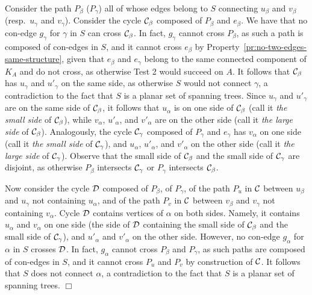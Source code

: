 \documentclass[letter,runningheads]{llncs}
\renewenvironment{proof}
{{\em Proof.\ }}{\hspace*{\fill}$\Box$\par\vspace{2mm}}
\begin{document}
\begin{proof}
Consider the path $P_{\beta}$ ($P_{\gamma}$) all of whose edges belong to $S$ connecting $u_{\beta}$ and $v_{\beta}$ (resp.\ $u_{\gamma}$ and $v_{\gamma}$). Consider the cycle ${\cal C}_{\beta}$ composed of $P_{\beta}$ and $e_{\beta}$. We have that no con-edge $g_{\gamma}$ for $\gamma$ in $S$ can cross ${\cal C}_{\beta}$. In fact, $g_{\gamma}$ cannot cross $P_{\beta}$, as such a path is composed of con-edges in $S$, and it cannot cross $e_{\beta}$ by Property~\ref{pr:no-two-edges-same-structure}, given that $e_{\beta}$ and $e_{\gamma}$ belong to the same connected component of $K_A$ and do not cross, as otherwise {\sc Test 2} would succeed on $A$. It follows that ${\cal C}_{\beta}$ has $u_{\gamma}$ and $u'_{\gamma}$ on the same side, as otherwise $S$ would not connect $\gamma$, a contradiction to the fact that $S$ is a planar set of spanning trees. Since $u_{\gamma}$ and $u'_{\gamma}$ are on the same side of ${\cal C}_{\beta}$, it follows that $u_{\alpha}$ is on one side of ${\cal C}_{\beta}$ (call it {\em the small side} of ${\cal C}_{\beta}$), while $v_{\alpha}$, $u'_{\alpha}$, and $v'_{\alpha}$ are on the other side (call it {\em the large side} of ${\cal C}_{\beta}$). Analogously, the cycle ${\cal C}_{\gamma}$ composed of $P_{\gamma}$ and $e_{\gamma}$ has $v_{\alpha}$ on one side (call it {\em the small side} of ${\cal C}_{\gamma}$), and $u_{\alpha}$, $u'_{\alpha}$, and $v'_{\alpha}$ on the other side (call it {\em the large side} of ${\cal C}_{\gamma}$). Observe that the small side of ${\cal C}_{\beta}$ and the small side of ${\cal C}_{\gamma}$ are disjoint, as otherwise $P_{\beta}$ intersects ${\cal C}_{\gamma}$ or $P_{\gamma}$ intersects ${\cal C}_{\beta}$.

Now consider the cycle ${\cal D}$ composed of $P_{\beta}$, of $P_{\gamma}$, of the path $P_u$ in $\cal C$ between $u_{\beta}$ and $u_{\gamma}$ not containing $u_{\alpha}$, and of the path $P_v$ in $\cal C$ between $v_{\beta}$ and $v_{\gamma}$ not containing $v_{\alpha}$. Cycle ${\cal D}$ contains vertices of $\alpha$ on both sides. Namely, it contains $u_{\alpha}$ and $v_{\alpha}$ on one side (the side of ${\cal D}$ containing the small side of ${\cal C}_{\beta}$ and the small side of ${\cal C}_{\gamma}$), and $u'_{\alpha}$ and $v'_{\alpha}$ on the other side. However, no con-edge $g_{\alpha}$ for $\alpha$ in $S$ crosses ${\cal D}$. In fact, $g_{\alpha}$ cannot cross $P_{\beta}$ and $P_{\gamma}$, as such paths are composed of con-edges in $S$, and it cannot cross $P_u$ and $P_v$ by construction of ${\cal C}$. It follows that $S$ does not connect $\alpha$, a contradiction to the fact that $S$ is a planar set of spanning trees.
\end{proof}
\end{document}
